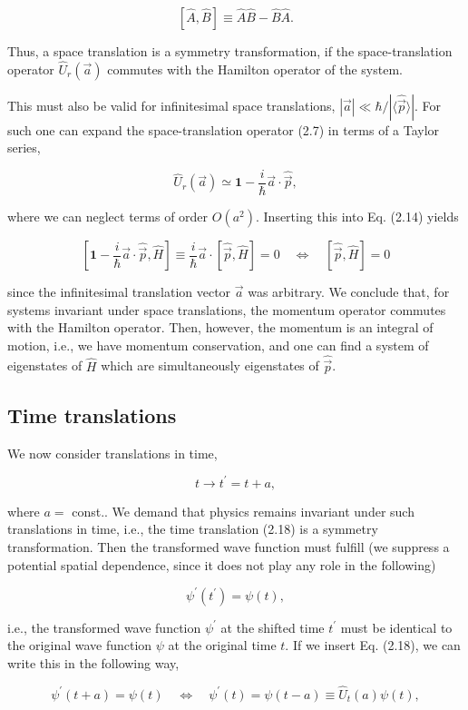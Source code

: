 \documentclass[10pt, letterpaper]{article}
\begin{document}
$$
[\hat{A}, \hat{B}] \equiv \hat{A} \hat{B}-\hat{B} \hat{A} .
$$

Thus, a space translation is a symmetry transformation, if the space-translation operator $\hat{U}_{r}(\vec{a})$ commutes with the Hamilton operator of the system.

This must also be valid for infinitesimal space translations, $|\vec{a}| \ll \hbar /|\langle\hat{\vec{p}}\rangle|$. For such one can expand the space-translation operator (2.7) in terms of a Taylor series,

$$
\hat{U}_{r}(\vec{a}) \simeq \mathbf{1}-\frac{i}{\hbar} \vec{a} \cdot \hat{\vec{p}},
$$

where we can neglect terms of order $O\left(a^{2}\right)$. Inserting this into Eq. (2.14) yields

$$
\left[\mathbf{1}-\frac{i}{\hbar} \vec{a} \cdot \hat{\vec{p}}, \hat{H}\right] \equiv \frac{i}{\hbar} \vec{a} \cdot[\hat{\vec{p}}, \hat{H}]=0 \quad \Longleftrightarrow \quad[\hat{\vec{p}}, \hat{H}]=0
$$

since the infinitesimal translation vector $\vec{a}$ was arbitrary. We conclude that, for systems invariant under space translations, the momentum operator commutes with the Hamilton operator. Then, however, the momentum is an integral of motion, i.e., we have momentum conservation, and one can find a system of eigenstates of $\hat{H}$ which are simultaneously eigenstates of $\hat{\vec{p}}$.

\subsection{Time translations}
We now consider translations in time,

$$
t \longrightarrow t^{\prime}=t+a,
$$

where $a=$ const.. We demand that physics remains invariant under such translations in time, i.e., the time translation (2.18) is a symmetry transformation. Then the transformed wave function must fulfill (we suppress a potential spatial dependence, since it does not play any role in the following)

$$
\psi^{\prime}\left(t^{\prime}\right)=\psi(t),
$$

i.e., the transformed wave function $\psi^{\prime}$ at the shifted time $t^{\prime}$ must be identical to the original wave function $\psi$ at the original time $t$. If we insert Eq. (2.18), we can write this in the following way,

$$
\psi^{\prime}(t+a)=\psi(t) \quad \Longleftrightarrow \quad \psi^{\prime}(t)=\psi(t-a) \equiv \hat{U}_{t}(a) \psi(t),
$$
\end{document}
